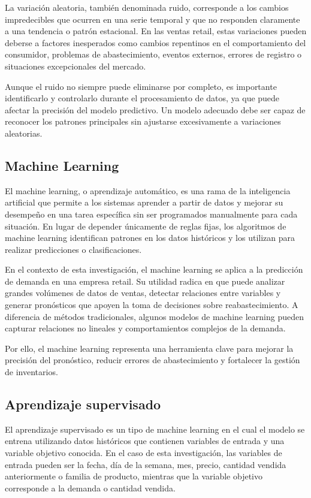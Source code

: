 La variación aleatoria, también denominada ruido, corresponde a los cambios impredecibles que ocurren en una serie temporal y que no responden claramente a una tendencia o patrón estacional. En las ventas retail, estas variaciones pueden deberse a factores inesperados como cambios repentinos en el comportamiento del consumidor, problemas de abastecimiento, eventos externos, errores de registro o situaciones excepcionales del mercado.

Aunque el ruido no siempre puede eliminarse por completo, es importante identificarlo y controlarlo durante el procesamiento de datos, ya que puede afectar la precisión del modelo predictivo. Un modelo adecuado debe ser capaz de reconocer los patrones principales sin ajustarse excesivamente a variaciones aleatorias.

\subsection{Machine Learning}

El machine learning, o aprendizaje automático, es una rama de la inteligencia artificial que permite a los sistemas aprender a partir de datos y mejorar su desempeño en una tarea específica sin ser programados manualmente para cada situación. En lugar de depender únicamente de reglas fijas, los algoritmos de machine learning identifican patrones en los datos históricos y los utilizan para realizar predicciones o clasificaciones.

En el contexto de esta investigación, el machine learning se aplica a la predicción de demanda en una empresa retail. Su utilidad radica en que puede analizar grandes volúmenes de datos de ventas, detectar relaciones entre variables y generar pronósticos que apoyen la toma de decisiones sobre reabastecimiento. A diferencia de métodos tradicionales, algunos modelos de machine learning pueden capturar relaciones no lineales y comportamientos complejos de la demanda.

Por ello, el machine learning representa una herramienta clave para mejorar la precisión del pronóstico, reducir errores de abastecimiento y fortalecer la gestión de inventarios.

\subsection{Aprendizaje supervisado}

El aprendizaje supervisado es un tipo de machine learning en el cual el modelo se entrena utilizando datos históricos que contienen variables de entrada y una variable objetivo conocida. En el caso de esta investigación, las variables de entrada pueden ser la fecha, día de la semana, mes, precio, cantidad vendida anteriormente o familia de producto, mientras que la variable objetivo corresponde a la demanda o cantidad vendida.

